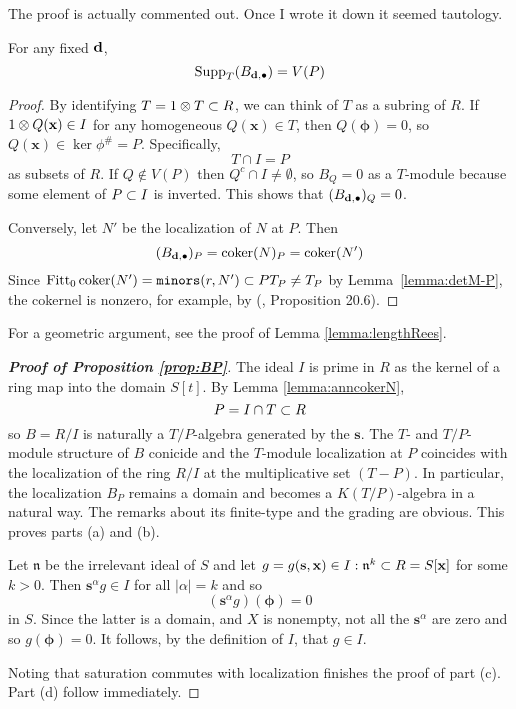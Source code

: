 \documentclass[fleqn,reqno]{amsart}
\numberwithin{first}{chapter}
\begin{document}
\begin{remarkhint}
The proof is actually commented out. Once I wrote it down it seemed tautology.
\end{remarkhint}

\begin{lemma}
\label{lemma:anncokerN}
For any fixed $\mathbf d$,
\[
\operatorname{Supp}_T(B_{\mathbf d,\bullet})=V(P)
\]
\end{lemma}

\begin{proof}
By identifying $T=1\otimes T\subset R$, we can think of $T$ as a subring of $R$. If $1\otimes Q(\mathbf x)\in I$ for
any homogeneous $Q(\mathbf x)\in T$, then $Q(\mathbf \phi)=0$, so $Q(\mathbf x)\in\ker\phi^\#=P$. 
Specifically,
\[
	T\cap I=P
\]
as subsets of $R$.
If $Q\notin V(P)$ then $Q^c\cap I\neq\emptyset$, so $B_Q=0$ as a $T$-module
because some element of $P\subset I$ is inverted. This shows that $(B_{\mathbf d,\bullet})_Q=0$.

Conversely, let $N'$ be the localization of $N$ at $P$.
Then 
\[
	(B_{\mathbf d,\bullet})_P=\operatorname{coker}(N)_P=\operatorname{coker}(N')
\]
Since $\operatorname{Fitt}_0\operatorname{coker}(N')=\mathop{\tt minors}(r,N')\subset PT_P\neq T_P$ by Lemma~\ref{lemma:detM-P},
the cokernel is nonzero, for example, by (\citet{Eis-book-95}, Proposition 20.6).
\end{proof}

\begin{remarkhint}
For a geometric argument, see the proof of Lemma \ref{lemma:lengthRees}.
\end{remarkhint}

\begin{proof}[\bf Proof of Proposition \ref{prop:BP}]
The ideal $I$ is prime in $R$ as the kernel of a ring map into the domain $S[t]$.
By Lemma \ref{lemma:anncokerN},
\[
P=I\cap T\subset R
\]
so $B=R/I$ is naturally a $T/P$-algebra generated by the $\mathbf{s}$.
The $T$- and $T/P$-module structure of $B$ conicide and the $T$-module localization
at $P$ coincides with the localization of the ring $R/I$ at the multiplicative set $(T-P)$.
In particular, the localization $B_P$ remains a domain and becomes a $K(T/P)$-algebra
in a natural way.
The remarks about its finite-type and the grading are obvious.
This proves parts (a) and (b).

Let $\mathfrak{n}$ be the irrelevant ideal of $S$
and let $g=g(\mathbf s,\mathbf x)\in I:\mathfrak{n}^k\subset R=S[\mathbf x]$ for some $k>0$.
Then $\mathbf s^\alpha g\in I$ for all $|\alpha|=k$ and so
\[
(\mathbf s^\alpha g)(\mathbf\phi)=0
\]
in $S$. Since the latter is a domain, and $X$ is nonempty,
not all the $\mathbf s^\alpha$ are zero and so $g(\mathbf\phi)=0$.
It follows, by the definition of $I$, that $g\in I$.

Noting that saturation commutes with localization finishes the proof of part (c).
Part (d) follow immediately.
\end{proof}
\end{document}
